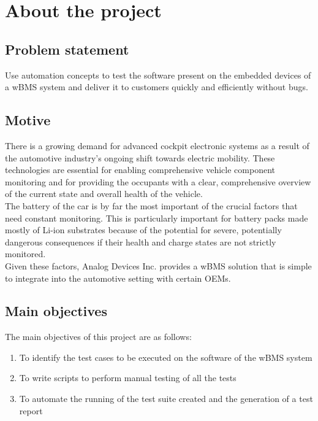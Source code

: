 \chapter{About the project} %

\label{ch:about}


\section{Problem statement}
Use automation concepts to test the software present on the embedded devices of a wBMS system and deliver it to customers quickly and efficiently without bugs.

\section{Motive}
There is a growing demand for advanced cockpit electronic systems as a result of the automotive industry's ongoing shift towards electric mobility. These technologies are essential for enabling comprehensive vehicle component monitoring and for providing the occupants with a clear, comprehensive overview of the current state and overall health of the vehicle. \\
The battery of the car is by far the most important of the crucial factors that need constant monitoring. This is particularly important for battery packs made mostly of Li-ion substrates because of the potential for severe, potentially dangerous consequences if their health and charge states are not strictly monitored. \\
Given these factors, Analog Devices Inc. provides a wBMS solution that is simple to integrate into the automotive setting with certain OEMs.
\newpage
\section{Main objectives}
The main objectives of this project are as follows:
\begin{enumerate}
    \item To identify the test cases to be executed on the software of the wBMS system
    \item To write scripts to perform manual testing of all the tests
    \item To automate the running of the test suite created and the generation of a test report
\end{enumerate}